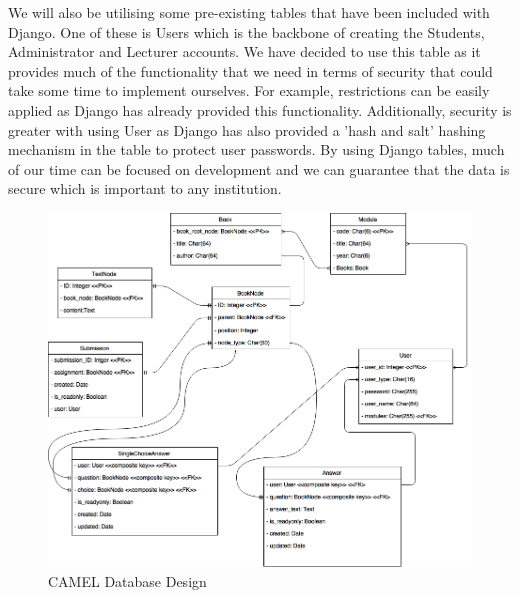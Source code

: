 	We will also be utilising some pre-existing tables that have been included with Django. One of these is Users which is the backbone of creating the Students, Administrator and Lecturer accounts. We have decided to use this table as it provides much of the functionality that we need in terms of security that could take some time to implement ourselves. For example, restrictions can be easily applied as Django has already provided this functionality. Additionally, security is greater with using User as Django has also provided a 'hash and salt' hashing mechanism in the table to protect user passwords. By using Django tables, much of our time can be focused on development and we can guarantee that the data is secure which is important to any institution.\\	
	
	\begin{figure}[h]
		\includegraphics[scale=0.5]{implementation/img/database_design}
		\caption{CAMEL Database Design}
	\end{figure}